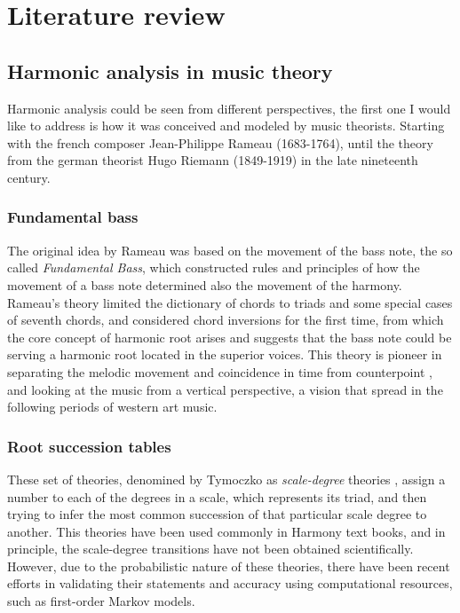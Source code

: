 \chapter{Literature review}
\section{Harmonic analysis in music theory}
Harmonic analysis could be seen from different perspectives, the first one I would like to address is how it was conceived and modeled by music theorists. Starting with the french composer Jean-Philippe Rameau (1683-1764), until the theory from the german theorist Hugo Riemann (1849-1919) in the late nineteenth century.
  \subsection{Fundamental bass}
  The original idea by Rameau was based on the movement of the bass note, the so called \emph{Fundamental Bass}, which constructed rules and principles of how the movement of a bass note determined also the movement of the harmony. Rameau's theory limited the dictionary of chords to triads and some special cases of seventh chords, and considered chord inversions for the first time, from which the core concept of harmonic root arises and suggests that the bass note could be serving a harmonic root located in the superior voices. This theory is pioneer in separating the melodic movement and coincidence in time from counterpoint \cite{beach1974origins}, and looking at the music from a vertical perspective, a vision that spread in the following periods of western art music.
  \subsection{Root succession tables}
  These set of theories, denomined by Tymoczko as \emph{scale-degree} theories \cite{tymoczko2001root}, assign a number to each of the degrees in a scale, which represents its triad, and then trying to infer the most common succession of that particular scale degree to another. This theories have been used commonly in Harmony text books, and in principle, the scale-degree transitions have not been obtained scientifically. However, due to the probabilistic nature of these theories, there have been recent efforts in validating their statements and accuracy using computational resources, such as first-order Markov models.
